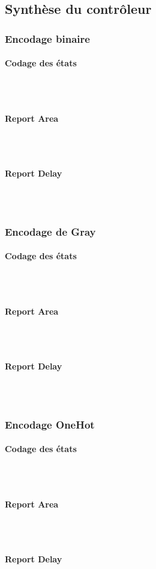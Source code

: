\documentclass{article}
\newcommand{\subsubsubsection}[1]{\paragraph{#1}\mbox{}\\}
\begin{document}
\newpage
\subsection{Synthèse du contrôleur}

\subsubsection{Encodage binaire}
\subsubsubsection{Codage des états}
\begin{verbatim}

\end{verbatim}
\subsubsubsection{Report Area}
\begin{verbatim}

\end{verbatim}
\subsubsubsection{Report Delay}
\begin{verbatim}

\end{verbatim}

\newpage
\subsubsection{Encodage de Gray}
\subsubsubsection{Codage des états}
\begin{verbatim}

\end{verbatim}
\subsubsubsection{Report Area}
\begin{verbatim}

\end{verbatim}
\subsubsubsection{Report Delay}
\begin{verbatim}

\end{verbatim}

\newpage
\subsubsection{Encodage OneHot}
\subsubsubsection{Codage des états}
\begin{verbatim}

\end{verbatim}
\subsubsubsection{Report Area}
\begin{verbatim}

\end{verbatim}
\subsubsubsection{Report Delay}
\begin{verbatim}

\end{verbatim}
\end{document}
